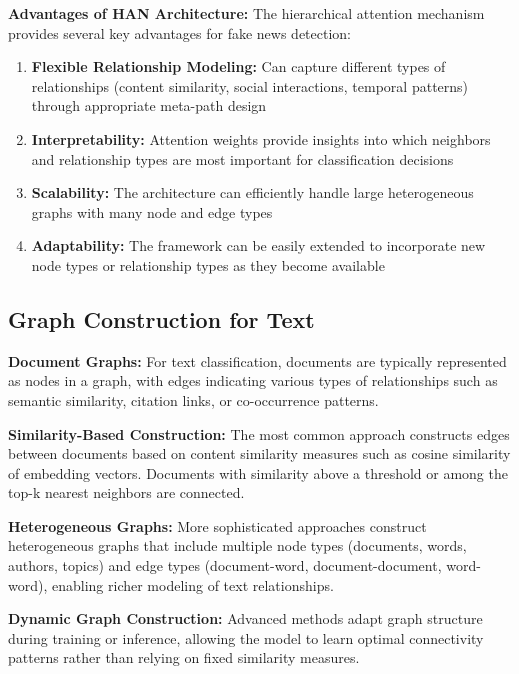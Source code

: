 
\textbf{Advantages of HAN Architecture:} The hierarchical attention mechanism provides several key advantages for fake news detection:
\begin{enumerate}
\item \textbf{Flexible Relationship Modeling:} Can capture different types of relationships (content similarity, social interactions, temporal patterns) through appropriate meta-path design
\item \textbf{Interpretability:} Attention weights provide insights into which neighbors and relationship types are most important for classification decisions  
\item \textbf{Scalability:} The architecture can efficiently handle large heterogeneous graphs with many node and edge types
\item \textbf{Adaptability:} The framework can be easily extended to incorporate new node types or relationship types as they become available
\end{enumerate}

\subsection{Graph Construction for Text}

\textbf{Document Graphs:} For text classification, documents are typically represented as nodes in a graph, with edges indicating various types of relationships such as semantic similarity, citation links, or co-occurrence patterns.

\textbf{Similarity-Based Construction:} The most common approach constructs edges between documents based on content similarity measures such as cosine similarity of embedding vectors. Documents with similarity above a threshold or among the top-k nearest neighbors are connected.

\textbf{Heterogeneous Graphs:} More sophisticated approaches construct heterogeneous graphs that include multiple node types (documents, words, authors, topics) and edge types (document-word, document-document, word-word), enabling richer modeling of text relationships.

\textbf{Dynamic Graph Construction:} Advanced methods adapt graph structure during training or inference, allowing the model to learn optimal connectivity patterns rather than relying on fixed similarity measures.


